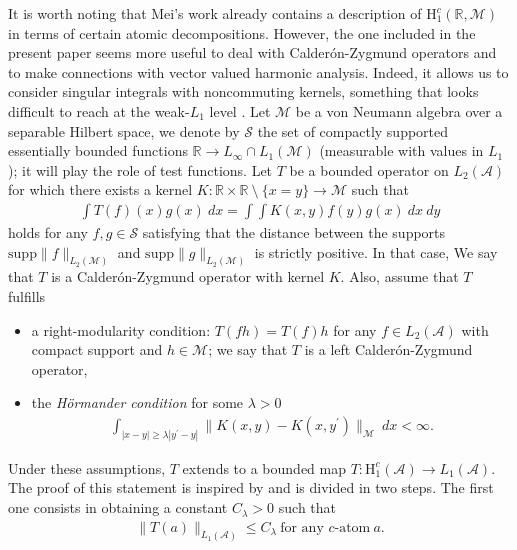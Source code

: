 \documentclass[psamsfonts]{amsart}
\newcommand{\Lone}{L_1}
\newcommand{\Linfty}{L_\infty}
\newcommand{\Ltwo}{L_2}
\newcommand{\Honec}{\mathrm{H}_1^c}
\newcommand{\Hardyc}{\Honec(\mathcal{A})}
\begin{document}
    It is worth noting that Mei's work already contains a description
    of $\Honec(\mathbb{R},\mathcal{M})$ in terms of certain atomic
    decompositions. However, the one included in the present paper
    seems more useful to deal with Calder\'on-Zygmund operators and to
    make connections with vector valued harmonic analysis. Indeed, it
    allows us to consider singular integrals with noncommuting
    kernels, something that looks difficult to reach at the
    weak-$\Lone$ level \cite{CCP22}.  Let $\mathcal{M}$
      be a von Neumann algebra over a separable Hilbert space, we
      denote by $\mathcal S$ the set of compactly supported  essentially
      bounded functions
      $\mathbb R\to \Linfty \cap \Lone(\mathcal{M})$ (measurable with values in $L_1$); it
      will play the role of test functions.
Let $T$ be a
    bounded operator on $\Ltwo(\mathcal{A})$ for which there exists a
    kernel
    $K : \mathbb{R} \times \mathbb{R} \ \setminus \ \{x=y\}
    \longrightarrow \mathcal{M}$ such that
    \begin{align*}
        \int T(f)(x) g(x) \ dx = \int \int K(x,y) f(y) g(x) \ dx \ dy
    \end{align*}
    holds for any $f,g \in \mathcal S$ satisfying that the distance between the supports $\mathrm{supp}\|f\|_{\Ltwo(\mathcal{M})}$ and $\mathrm{supp}\|g\|_{\Ltwo(\mathcal{M})}$ is strictly positive. In that case, We say that $T$ is a Calder\'on-Zygmund operator with kernel $K$. Also, assume that $T$ fulfills
    \begin{itemize}
        \item a right-modularity condition: $T(fh) = T(f)h$ for any $f \in \Ltwo(\mathcal{A})$ with compact support and $h \in \mathcal{M}$; we say that $T$ is a left Calder\'on-Zygmund operator,
        \item the \emph{Hörmander condition} for some $\lambda>0$
        \begin{align*}
            \int_{|x-y| \geq \lambda |y^\prime -y|} \|K(x,y)-K(x,y^\prime)\|_{\mathcal{M}} \ dx < \infty.
        \end{align*}        
      \end{itemize}
      
        Under these assumptions, $T$ extends to a bounded map $T : \Hardyc \longrightarrow \Lone(\mathcal{A})$. The proof of this statement is inspired by \cite{MeyC97} and is divided in two steps. The first one consists in obtaining a  constant $C_\lambda > 0$ such that
    \begin{align*}
        \|T(a)\|_{\Lone(\mathcal{A})} \leq C_\lambda \ \textrm{for \ any \  $c$-atom} \ a.
    \end{align*}
    
\end{document}
